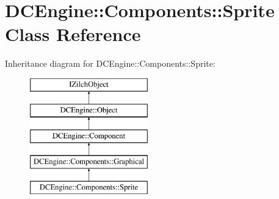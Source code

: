 \hypertarget{classDCEngine_1_1Components_1_1Sprite}{\section{D\-C\-Engine\-:\-:Components\-:\-:Sprite Class Reference}
\label{classDCEngine_1_1Components_1_1Sprite}
}
Inheritance diagram for D\-C\-Engine\-:\-:Components\-:\-:Sprite\-:\begin{figure}[H]
\begin{center}
\leavevmode
\includegraphics[height=5.000000cm]{classDCEngine_1_1Components_1_1Sprite}
\end{center}
\end{figure}
